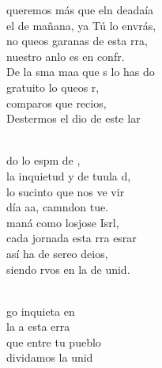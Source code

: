 \documentclass[12pt]{article}
\begin{document}
\begin{multicols*}{2}
\begin{cancion}%
	 queremos más que eln deadaía\\
	el de mañana, ya Tú lo envrás,\\
	no queos garanas de esta rra, \\
	nuestro anlo es en confr.\\
\jump
	De la sma maa que s lo has do\\
	gratuito lo queos r,\\
	comparos  que recios,\\
	Destermos el dio de este lar\\\jump\\
	\begin{chorus}%
	do lo espm de ,\\
	la inquietud y de tuula d,\\
	lo sucinto que nos ve vir\\
	día aa, camndon tue. \\
\jump
	 maná como losjose Isrl,\\
	cada jornada esta rra esrar\\
	así ha de sereo deios,\\
	siendo rvos en la de  unid.\\
	\end{chorus}%
	\jump\\
	go inquieta en \\
	la a  esta erra\\
que entre tu pueblo \\
	dividamos la unid\\

\end{cancion}
\end{multicols*}
\end{document}
